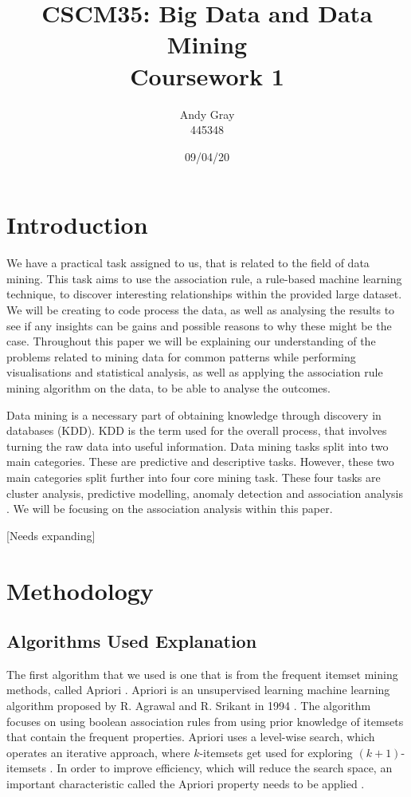 \documentclass[a4paper,10pt]{article}
\begin{document}
\title{\textbf{CSCM35: Big Data and Data Mining \\Coursework 1}}
\date{09/04/20}
\author{Andy Gray\\445348}

\maketitle

\section{Introduction}

We have a practical task assigned to us, that is related to the field of data mining. This task aims to use the association rule, a rule-based machine learning technique, to discover interesting relationships within the provided large dataset. We will be creating to code process the data, as well as analysing the results to see if any insights can be gains and possible reasons to why these might be the case. Throughout this paper we will be explaining our understanding of the problems related to mining data for common patterns while performing visualisations and statistical analysis, as well as applying the association rule mining algorithm on the data, to be able to analyse the outcomes.

Data mining is a necessary part of obtaining knowledge through discovery in databases (KDD). KDD is the term used for the overall process, that involves turning the raw data into useful information. Data mining tasks split into two main categories. These are predictive and descriptive tasks. However, these two main categories split further into four core mining task. These four tasks are cluster analysis, predictive modelling, anomaly detection and association analysis \cite{tan2016introduction}. We will be focusing on the association analysis within this paper.

[Needs expanding]

\section{Methodology}

\subsection{Algorithms Used Explanation}

The first algorithm that we used is one that is from the frequent itemset mining methods, called Apriori \cite{han2011data}. Apriori is an unsupervised learning machine learning algorithm proposed by R. Agrawal and R. Srikant in 1994 \cite{agrawal1994fast, geron2019hands}. The algorithm focuses on using boolean association rules \cite{agrawal1994fast} from using prior knowledge of itemsets that contain the frequent properties. Apriori uses a level-wise search, which operates an iterative approach, where $k$-itemsets get used for exploring $(k+1)$-itemsets \cite{jingjingslides}. In order to improve efficiency, which will reduce the search space, an important characteristic called the Apriori property needs to be applied \cite{han2011data}. 
\end{document}
